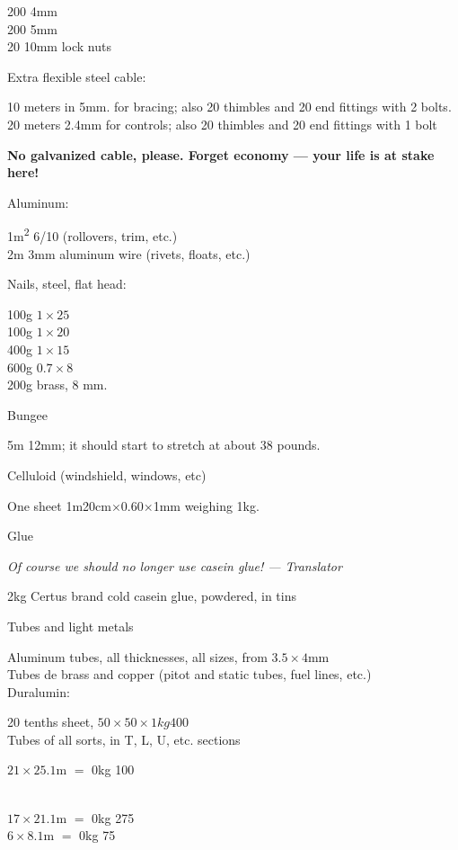 \documentclass{book}
\begin{document}
{{  200 4mm\\
  200 5mm\\
  20 10mm lock nuts

  Extra flexible steel cable:

  10 meters in 5mm. for bracing; also 20 thimbles and 20 end fittings
  with 2 bolts.\\
  20 meters 2.4mm for controls; also 20 thimbles and 20 end fittings
  with 1 bolt

  \textbf{No galvanized cable, please.  Forget economy --- your life
    is at stake here!}

  Aluminum:

  1m\textsuperscript{2} 6/10 (rollovers, trim, etc.)\\
  2m 3mm aluminum wire (rivets, floats, etc.)

  Nails, steel, flat head:

  100g $1\times25$\\
  100g $1\times20$\\
  400g $1\times15$\\
  600g $0.7\times8$\\
  200g brass, 8 mm.

\item{Bungee}

  5m 12mm; it should start to stretch at about 38 pounds.

\item{Celluloid (windshield, windows, etc)}

  One sheet 1m20cm$\times$0.60$\times$1mm weighing 1kg.

\item{Glue}

  \textit{Of course we should no longer use casein glue! --- Translator}

  2kg Certus brand cold casein glue, powdered, in tins

\item{Tubes and light metals}

  Aluminum tubes, all thicknesses, all sizes, from $3.5\times4$mm\\
  Tubes de brass and copper (pitot and static tubes, fuel lines, etc.)\\
  
  Duralumin:

  20 tenths sheet, $50\times50\times1kg400$\\
  Tubes of all sorts, in T, L, U, etc. sections

  $21\times25.1$m $=$ 0kg 100}\\
  $17\times21.1$m $=$ 0kg 275\\
  $6\times8.1$m $=$ 0kg 75

}
\end{document}
